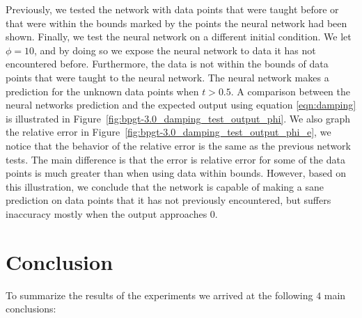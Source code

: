 \documentclass[11pt]{article}
\begin{document}
Previously, we tested the network with data points that were taught before or that were within the bounds marked by the points the
neural network had been shown. Finally, we test the neural network on a different initial condition. We let $\phi=10$, and by doing so
we expose the neural network to data it has not encountered before. Furthermore, the data is not within the bounds of data points that
were taught to the neural network. The neural network makes a prediction for the unknown data points when $t > 0.5$. A comparison
between the neural networks prediction and the expected output using equation \ref{eqn:damping} is illustrated in
Figure~\ref{fig:bpgt-3.0_damping_test_output_phi}. We also graph the relative error in
Figure~\ref{fig:bpgt-3.0_damping_test_output_phi_e}, we notice that the behavior of the relative error is the same as the previous
network tests. The main difference is that the error is relative error for some of the data points is much greater than when using data
within bounds. However, based on this illustration, we conclude that the network is capable of making a sane prediction on data points
that it has not previously encountered, but suffers inaccuracy mostly when the output approaches $0$.



\section{Conclusion} %
\label{sec:conclusion}

To summarize the results of the experiments we arrived at the following $4$ main conclusions:
\end{document}

